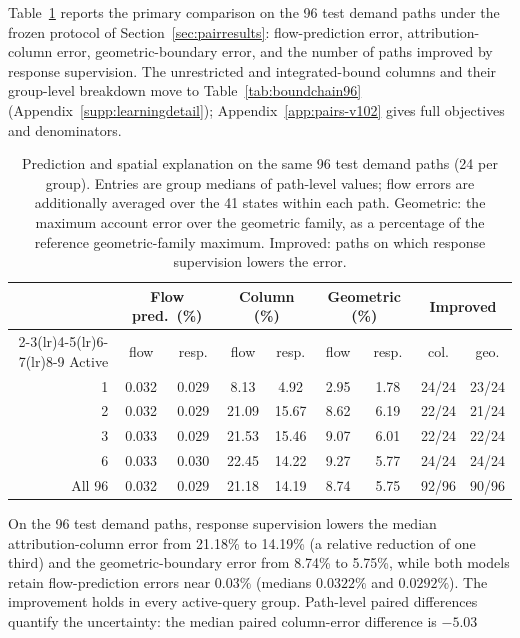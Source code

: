 Table~\ref{tab:pathtable} reports the primary comparison on the 96
test demand paths under the frozen protocol of
Section~\ref{sec:pairresults}: flow-prediction error, attribution-column
error, geometric-boundary error, and the number of paths improved by
response supervision. The unrestricted and integrated-bound columns
and their group-level breakdown move to
Table~\ref{tab:boundchain96} (Appendix~\ref{supp:learningdetail});
Appendix~\ref{app:pairs-v102} gives full objectives and denominators.
\begin{table}[t]\centering\footnotesize
\caption{Prediction and spatial explanation on the same 96 test demand
paths (24 per group). Entries are group medians of path-level values;
flow errors are additionally averaged over the 41 states within each
path. Geometric: the maximum account error over the geometric family,
as a percentage of the reference geometric-family maximum. Improved:
paths on which response supervision lowers the error.}\label{tab:pathtable}
\setlength{\tabcolsep}{4.5pt}
\begin{tabular*}{\tblwidth}{@{\extracolsep{\fill}}rcc cc cc cc}
\toprule
& \multicolumn{2}{c}{Flow pred.\ (\%)} & \multicolumn{2}{c}{Column (\%)} & \multicolumn{2}{c}{Geometric (\%)} & \multicolumn{2}{c}{Improved}\\
\cmidrule(lr){2-3}\cmidrule(lr){4-5}\cmidrule(lr){6-7}\cmidrule(lr){8-9}
Active & flow & resp. & flow & resp. & flow & resp. & col. & geo.\\
\midrule
1 & 0.032 & 0.029 & 8.13 & 4.92 & 2.95 & 1.78 & 24/24 & 23/24\\
2 & 0.032 & 0.029 & 21.09 & 15.67 & 8.62 & 6.19 & 22/24 & 21/24\\
3 & 0.033 & 0.029 & 21.53 & 15.46 & 9.07 & 6.01 & 22/24 & 22/24\\
6 & 0.033 & 0.030 & 22.45 & 14.22 & 9.27 & 5.77 & 24/24 & 24/24\\
\midrule
All 96 & 0.032 & 0.029 & 21.18 & 14.19 & 8.74 & 5.75 & 92/96 & 90/96\\
\bottomrule\end{tabular*}\end{table}
On the 96 test demand paths, response supervision lowers the median
attribution-column error from 21.18\% to 14.19\% (a relative reduction
of one third) and the geometric-boundary error from 8.74\% to 5.75\%,
while both models retain flow-prediction errors near $0.03\%$ (medians
$0.0322\%$ and $0.0292\%$). The improvement holds in every
active-query group. Path-level paired differences quantify the
uncertainty: the median paired column-error difference is $-5.03$
